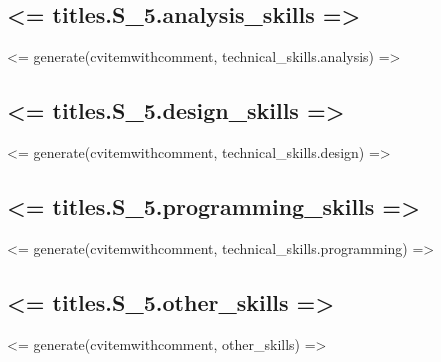 \documentclass[11pt,a4paper,sans]{moderncv}
\begin{document}
		\subsection{<= titles.S_5.analysis_skills =>}
			<= generate(cvitemwithcomment, technical_skills.analysis) =>
		\subsection{<= titles.S_5.design_skills =>}
			<= generate(cvitemwithcomment, technical_skills.design) =>
		\subsection{<= titles.S_5.programming_skills =>}
			<= generate(cvitemwithcomment, technical_skills.programming) =>
    \subsection{<= titles.S_5.other_skills =>}
		  <= generate(cvitemwithcomment, other_skills) =>




	
	\renewcommand{\refname}{Articles}
	\nocite{*}
	
	
\end{document}
